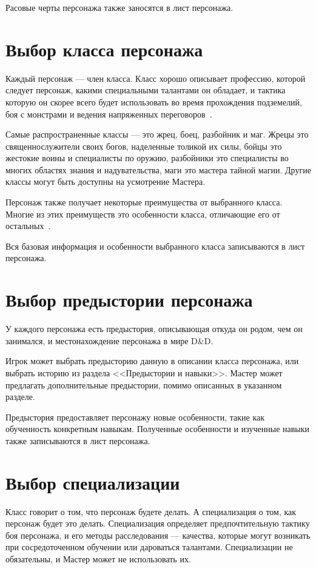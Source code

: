 Расовые черты персонажа также заносятся в лист персонажа.

\section{Выбор класса персонажа}

Каждый персонаж --- член класса. Класс хорошо описывает профессию, которой следует персонаж, какими специальными талантами он обладает, и тактика которую он скорее всего будет использовать во время прохождения подземелий, боя с монстрами и ведения напряженных переговоров~\cite{VolosGuidetoMonsters}.

Самые распространенные классы --- это жрец, боец, разбойник и маг. Жрецы это священнослужители своих богов, наделенные толикой их силы, бойцы это жестокие воины и специалисты по оружию, разбойники это специалисты во многих областях знания и надувательства, маги это мастера тайной магии. Другие классы могут быть доступны на усмотрение Мастера.

Персонаж также получает некоторые преимущества от выбранного класса. Многие из этих преимуществ это особенности класса, отличающие его от остальных~\cite{MORDENKAINENSTOMEOFFOES, XanatharsGuidetoEverything, SwordCoastAdventurersGuide}.

Вся базовая информация и особенности выбранного класса записываются в лист персонажа.

\section{Выбор предыстории персонажа}

У каждого персонажа есть предыстория, описывающая откуда он родом, чем он занимался, и местонахождение персонажа в мире D\&D.

Игрок может выбрать предысторию данную в описании класса персонажа, или выбрать историю из раздела <<Предыстории и навыки>>. Мастер может предлагать дополнительные предыстории, помимо описанных в указанном разделе.

Предыстория предоставляет персонажу новые особенности, такие как обученность конкретным навыкам. Полученные особенности и изученные навыки также записываются в лист персонажа.

\section{Выбор специализации}

Класс говорит о том, что персонаж будете делать. А специализация о том, как персонаж будет это делать. Специализация определяет предпочтительную тактику боя персонажа, и его методы расследования --- качества, которые могут возникать при сосредоточенном обучении или дароваться талантами. Специализации не обязательны, и Мастер может не использовать их.

